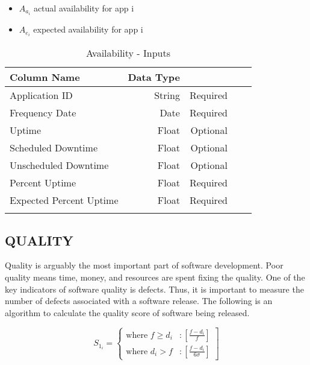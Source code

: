 \documentclass[SDSUThesis.tex]{subfiles}
\begin{document}
\begin{itemize}
\item $A_{a_i}$ actual availability for app i
\item $A_{e_i}$ expected availability for app i
\end{itemize}

\begin{longtable}{@{}l rr rr}

\toprule%
 \centering%
 {\bfseries Column Name}
 & {\bfseries Data Type}
 &  \\

\cmidrule[0.4pt](r{0.125em}){1-1}%
\cmidrule[0.4pt](lr{0.125em}){2-2}%
\cmidrule[0.4pt](l{0.125em}){3-3}%
\endhead

Application ID & String  & Required \\
\myrowcolour%
Frequency Date & Date & Required \\
Uptime & Float & Optional \\
\myrowcolour%
Scheduled Downtime & Float & Optional \\
Unscheduled Downtime & Float  & Optional \\
\myrowcolour%
Percent Uptime & Float & Required \\
Expected Percent Uptime & Float & Required \\

\bottomrule

\caption{Availability - Inputs}
\label{tab:avail}
\end{longtable}


\subsection{QUALITY}
Quality is arguably the most important part of software development.  Poor quality means time, money, and resources are spent 
fixing the quality.  One of the key indicators of software quality is defects.  Thus, it is important
to measure the number of defects associated with a software release.  The following is an algorithm to calculate
the quality score of software being released. 


\begin{displaymath}
   S_{1_i} = \left\{
     \begin{array}{lr}
       \text{where } f \geq d_i & : \left[ \frac{f - d_i}{f} \right] \\
       \text{where } d_i > f  & : \left[ \frac{f-d_i }{6\sigma} \right]
     \end{array}
   \right]
\end{displaymath} 
\end{document}
